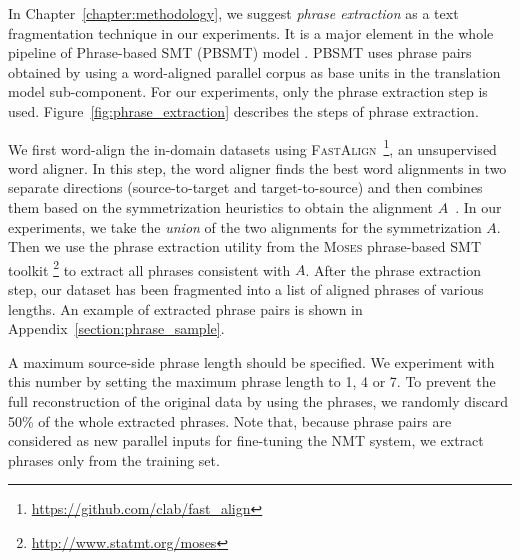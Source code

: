 In Chapter~\ref{chapter:methodology}, we suggest \textit{phrase extraction} as a text fragmentation technique in our experiments. It is a major element in the whole pipeline of Phrase-based SMT (PBSMT) model \parencite{koehn-etal-2003-statistical}. PBSMT uses phrase pairs obtained by using a word-aligned parallel corpus as base units in the translation model sub-component. For our experiments, only the phrase extraction step is used. Figure~\ref{fig:phrase_extraction} describes the steps of phrase extraction. 

We first word-align the in-domain datasets using \textsc{FastAlign}~\parencite{dyer-etal-2013-simple}\footnote{\url{https://github.com/clab/fast\_align}}, an unsupervised word aligner. In this step, the word aligner finds the best word alignments in two separate directions (source-to-target and target-to-source) and then combines them based on the symmetrization heuristics to obtain the alignment $A$~\parencite{och-etal-1999-improved, koehn-etal-2003-statistical}. In our experiments, we take the \textit{union} of the two alignments for the symmetrization $A$. Then we use the phrase extraction utility from the \textsc{Moses} phrase-based SMT toolkit \cite{koehn-etal-2007-moses}\footnote{\url{http://www.statmt.org/moses}} to extract all phrases consistent with $A$. After the phrase extraction step, our dataset has been fragmented into a list of aligned phrases of various lengths. An example of extracted phrase pairs is shown in Appendix~\ref{section:phrase_sample}.

A maximum source-side phrase length should be specified. 
We experiment with this number by setting the maximum phrase length to 1, 4 or 7. To prevent the full reconstruction of the original data by using the phrases, we randomly discard 50\% of the whole extracted phrases. Note that, because phrase pairs are considered as new parallel inputs for fine-tuning the NMT system, we extract phrases only from the training set.

